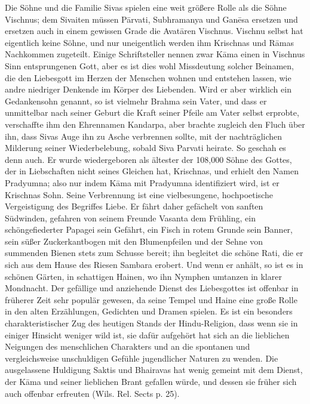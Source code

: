 \documentclass{article}
\begin{document}
Die Söhne und die Familie Sivas spielen eine weit größere Rolle als die Söhne Vischnus; dem Sivaiten müssen P\={a}rvati, Subhramanya und Gan\={e}sa ersetzen und ersetzen auch in einem gewissen Grade die Avat\={a}ren Vischnus. Vischnu selbst hat eigentlich keine Söhne, und nur uneigentlich werden ihm Krischnas und R\={a}mas Nachkommen zugeteilt. Einige Schriftsteller nennen zwar K\={a}ma einen in Vischnus Sinn entsprungenen Gott, aber es ist dies wohl Missdeutung solcher Beinamen, die den Liebesgott im Herzen der Menschen wohnen und entstehen lassen, wie andre niedriger Denkende im Körper des Liebenden. Wird er aber wirklich ein Gedankensohn genannt, so ist vielmehr Brahma sein Vater, und dass er unmittelbar nach seiner Geburt die Kraft seiner Pfeile am Vater selbst erprobte, verschaffte ihm den Ehrennamen Kandarpa, aber brachte zugleich den Fluch über ihn, dass Sivas Auge ihn zu Asche verbrennen sollte, mit der nachträglichen Milderung seiner Wiederbelebung, sobald Siva Parvati heirate. So geschah es denn auch. Er wurde wiedergeboren als ältester der 108,000 Söhne des Gottes, der in Liebschaften nicht seines Gleichen hat, Krischnas, und erhielt den Namen Pradyumna; also nur indem K\={a}ma mit Pradyumna identifiziert wird, ist er Krischnas Sohn. Seine Verbrennung ist eine vielbesungene, hochpoetische Vergeistigung des Begriffes Liebe. Er fährt daher gefächelt von sanften Südwinden, gefahren von seinem Freunde Vasanta dem Frühling, ein schöngefiederter Papagei sein Gefährt, ein Fisch in rotem Grunde sein Banner, sein süßer Zuckerkantbogen mit den Blumenpfeilen und der Sehne von summenden Bienen stets zum Schusse bereit; ihn begleitet die schöne Rati, die er sich aus dem Hause des Riesen Sambara erobert. Und wenn er anhält, so ist es in schönen Gärten, in schattigen Hainen, wo ihn Nymphen umtanzen in klarer Mondnacht. Der gefällige und anziehende Dienst des Liebesgottes ist offenbar in früherer Zeit sehr populär gewesen, da seine Tempel und Haine eine große Rolle in den alten Erzählungen, Gedichten und Dramen spielen. Es ist ein besonders charakteristischer Zug des heutigen Stands der Hindu-Religion, dass wenn sie in einiger Hinsicht weniger wild ist, sie dafür aufgehört hat sich an die lieblichen Neigungen des menschlichen Charakters und an die spontanen und vergleichsweise unschuldigen Gefühle jugendlicher Naturen zu wenden. Die ausgelassene Huldigung Saktis und Bhairavas hat wenig gemeint mit dem Dienst, der K\={a}ma und seiner lieblichen Brant gefallen würde, und dessen sie früher sich auch offenbar erfreuten (Wils. Rel. Sects p. 25).
\end{document}

